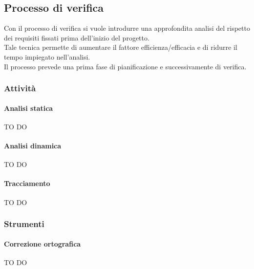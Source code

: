 







	\subsection{Processo di verifica}
	Con il processo di verifica si vuole introdurre una approfondita analisi del rispetto dei requisiti fissati prima dell'inizio del progetto.\\
	Tale tecnica permette di aumentare il fattore efficienza/efficacia e di ridurre il tempo impiegato nell'analisi.\\
	Il processo prevede una prima fase di pianificazione e successivamente di verifica.

		\subsubsection{Attività}
			\paragraph{Analisi statica} %
			\label{par:analisi_statica}
			TO DO
			
			\paragraph{Analisi dinamica} %
			\label{par:analisi_dinamica}
			TO DO

			\paragraph{Tracciamento} %
			\label{par:tracciamento}
			TO DO
			
			
			
		\subsubsection{Strumenti} %
		\label{ssub:strumenti}
			\paragraph{Correzione ortografica} %
			\label{par:correzione_ortografica}
			TO DO
			
